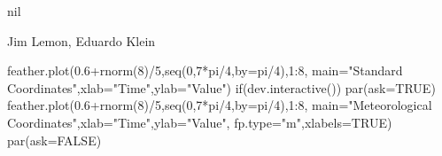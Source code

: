 \begin{Value}
nil
\end{Value}
\begin{Author}\relax
Jim Lemon, Eduardo Klein
\end{Author}
\begin{SeeAlso}\relax
{}
\end{SeeAlso}
\begin{Examples}
\begin{ExampleCode}
 feather.plot(0.6+rnorm(8)/5,seq(0,7*pi/4,by=pi/4),1:8,
  main="Standard Coordinates",xlab="Time",ylab="Value")
 if(dev.interactive()) par(ask=TRUE)
 feather.plot(0.6+rnorm(8)/5,seq(0,7*pi/4,by=pi/4),1:8,
  main="Meteorological Coordinates",xlab="Time",ylab="Value",
  fp.type="m",xlabels=TRUE)
 par(ask=FALSE)
\end{ExampleCode}
\end{Examples}

